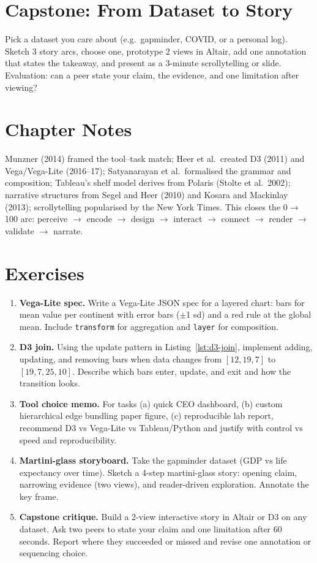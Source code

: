 \section{Capstone: From Dataset to Story}
Pick a dataset you care about (e.g.\ gapminder, COVID, or a personal log). Sketch 3 story arcs, choose one, prototype 2 views in Altair, add one annotation that states the takeaway, and present as a 3-minute scrollytelling or slide. Evaluation: can a peer state your claim, the evidence, and one limitation after viewing?

\section{Chapter Notes}
Munzner (2014) framed the tool--task match; Heer et al.\ created D3 (2011) and Vega/Vega-Lite (2016--17); Satyanarayan et al.\ formalised the grammar and composition; Tableau's shelf model derives from Polaris (Stolte et al.\, 2002); narrative structures from Segel and Heer (2010) and Kosara and Mackinlay (2013); scrollytelling popularised by the New York Times. This closes the 0$\to$100 arc: perceive $\to$ encode $\to$ design $\to$ interact $\to$ connect $\to$ render $\to$ validate $\to$ narrate.

\section{Exercises}
\label{sec:ch08-exercises}
\begin{enumerate}[label=E8.\arabic*, leftmargin=*, itemsep=0.8em]
    \item \textbf{Vega-Lite spec.} Write a Vega-Lite JSON spec for a layered chart: bars for mean value per continent with error bars ($\pm$1 sd) and a red rule at the global mean. Include \texttt{transform} for aggregation and \texttt{layer} for composition.
    \item \textbf{D3 join.} Using the update pattern in Listing~\ref{lst:d3-join}, implement adding, updating, and removing bars when data changes from $[12,19,7]$ to $[19,7,25,10]$. Describe which bars enter, update, and exit and how the transition looks.
    \item \textbf{Tool choice memo.} For tasks (a) quick CEO dashboard, (b) custom hierarchical edge bundling paper figure, (c) reproducible lab report, recommend D3 vs Vega-Lite vs Tableau/Python and justify with control vs speed and reproducibility.
    \item \textbf{Martini-glass storyboard.} Take the gapminder dataset (GDP vs life expectancy over time). Sketch a 4-step martini-glass story: opening claim, narrowing evidence (two views), and reader-driven exploration. Annotate the key frame.
    \item \textbf{Capstone critique.} Build a 2-view interactive story in Altair or D3 on any dataset. Ask two peers to state your claim and one limitation after 60 seconds. Report where they succeeded or missed and revise one annotation or sequencing choice.
\end{enumerate}
